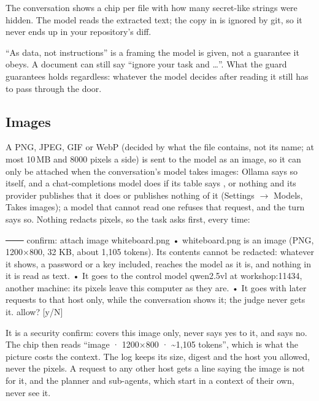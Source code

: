The conversation shows a chip per file with how many secret-like strings
were hidden. The model reads the extracted text; the copy in
 is ignored by git, so it never ends up in your
repository's diff.

\begin{careful}
``As data, not instructions'' is a framing the model is given, not a
guarantee it obeys. A document can still say ``ignore your task and
\ldots''. What the guard guarantees holds regardless: whatever the model
decides after reading it still has to pass through the door.
\end{careful}

\subsection{Images}

A PNG, JPEG, GIF or WebP (decided by what the file contains, not its name;
at most 10\,MB and 8000 pixels a side) is sent to the model as an image, so
it can only be attached when the conversation's model takes images: Ollama
says so itself, and a chat-completions model does if its table says
, or nothing and its provider publishes that it does or
publishes nothing of it (Settings $\to$ Models, Takes images); a model that
cannot read one refuses that request, and the turn says so.
Nothing redacts pixels, so the task asks first, every time:

\begin{txt}
─── confirm: attach image whiteboard.png
  • whiteboard.png is an image (PNG, 1200×800, 32 KB, about 1,105 tokens).
    Its contents cannot be redacted: whatever it shows, a password or a key
    included, reaches the model as it is, and nothing in it is read as text.
  • It goes to the control model qwen2.5vl at workshop:11434, another machine:
    its pixels leave this computer as they are.
  • It goes with later requests to that host only, while the conversation
    shows it; the judge never gets it.
allow? [y/N]
\end{txt}

It is a security confirm:  covers this image only, 
never says yes to it, and  says no. The chip then reads
``image · 1200×800 · \textasciitilde1,105 tokens'', which is what the
picture costs the context. The log keeps its size, digest and the host you
allowed, never the pixels. A request to any other host gets a line saying
the image is not for it, and the planner and sub-agents, which start in a
context of their own, never see it.

